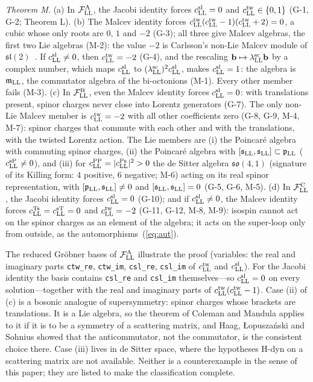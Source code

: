 \noindent\emph{Theorem M.} (a) In $\mathcal F^{\rm A}_{\rm LL}$, the Jacobi identity forces $c^{\rm
sl}_{\rm LL}=0$ and $c^{\rm tw}_{\rm LL}\in\{0,1\}$ (G-1, G-2; Theorem L). (b) The Malcev identity
forces $c^{\rm tw}_{\rm LL}(c^{\rm tw}_{\rm LL}-1)(c^{\rm tw}_{\rm LL}+2)=0$, a cubic whose only roots
are $0$, $1$ and $-2$ (G-3); all three give Malcev algebras, the first two Lie algebras (M-2): the
value $-2$ is Carlsson's non-Lie Malcev module of $\mathfrak{sl}(2)$~\cite{Carlsson1976,Elduque1990}. If
$c^{\rm sl}_{\rm LL}\neq0$, then $c^{\rm tw}_{\rm LL}=-2$ (G-4), and the rescaling $\mathbf
b\mapsto\lambda^{\rm sc}_{\rm LL}\mathbf b$ by a complex number, which maps $c^{\rm sl}_{\rm LL}$ to
$(\lambda^{\rm sc}_{\rm LL})^2c^{\rm sl}_{\rm LL}$, makes $c^{\rm sl}_{\rm LL}=1$: the algebra is
$\mathfrak m_{\rm LL}$, the commutator algebra of the bi-octonions (M-1). Every other member fails
(M-3). (c) In $\mathcal F^{\rm B}_{\rm LL}$, even the Malcev identity forces $c^{\rm sl}_{\rm LL}=0$:
with translations present, spinor charges never close into Lorentz generators (G-7). The only non-Lie
Malcev member is $c^{\rm tw}_{\rm LL}=-2$ with all other coefficients zero (G-8, G-9, M-4, M-7): spinor
charges that commute with each other and with the translations, with the twisted Lorentz action. The
Lie members are (i) the Poincar\'e algebra with commuting spinor charges, (ii) the Poincar\'e algebra
with $[\mathfrak s_{\rm LL},\mathfrak s_{\rm LL}]\subset\mathfrak p_{\rm LL}$ ($c^{\rm sP}_{\rm LL}\neq0$),
and (iii) for $c^{\rm PP}_{\rm LL}=\lvert c^{\rm Ps}_{\rm LL}\rvert^2>0$ the de Sitter algebra
$\mathfrak{so}(4,1)$ (signature of its Killing form: 4 positive, 6 negative; M-6) acting on its real
spinor representation, with $[\mathfrak p_{\rm LL},\mathfrak s_{\rm LL}]\neq0$ and $[\mathfrak s_{\rm
LL},\mathfrak s_{\rm LL}]=0$ (G-5, G-6, M-5). (d) In $\mathcal F^{\rm C}_{\rm LL}$, the Jacobi identity
forces $c^{\rm sl}_{\rm LL}=0$ (G-10); and if $c^{\rm sl}_{\rm LL}\neq0$, the Malcev identity forces
$c^{\rm Ts}_{\rm LL}=c^{\rm sT}_{\rm LL}=0$ and $c^{\rm tw}_{\rm LL}=-2$ (G-11, G-12, M-8, M-9): isospin
cannot act on the spinor charges as an element of the algebra; it acts on the super-loop only from
outside, as the automorphisms~(\ref{eq:aut}).

The reduced Gr\"obner bases of $\mathcal F^{\rm A}_{\rm LL}$ illustrate the proof (variables: the real
and imaginary parts \texttt{ctw\_re}, \texttt{ctw\_im}, \texttt{csl\_re}, \texttt{csl\_im} of $c^{\rm
tw}_{\rm LL}$ and $c^{\rm sl}_{\rm LL}$). For the Jacobi identity the basis contains \texttt{csl\_re}
and \texttt{csl\_im} themselves---so $c^{\rm sl}_{\rm LL}=0$ on every solution---together with the real
and imaginary parts of $c^{\rm tw}_{\rm LL}(c^{\rm tw}_{\rm LL}-1)$. Case (ii) of (c) is a bosonic
analogue of supersymmetry: spinor charges whose brackets are translations. It is a Lie algebra, so the
theorem of Coleman and Mandula applies to it if it is to be a symmetry of a scattering matrix, and
Haag, {\L}opusza\'nski and Sohnius showed that the anticommutator, not the commutator, is the
consistent choice there. Case (iii) lives in de Sitter space, where the hypotheses H-dyn on a scattering
matrix are not available. Neither is a counterexample in the sense of this paper; they are listed to
make the classification complete.

